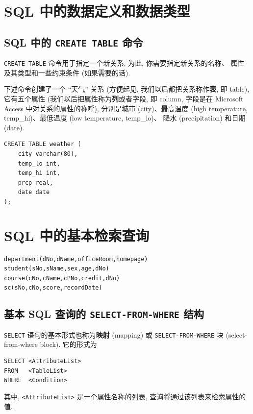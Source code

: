 \documentclass[10pt,UTF8]{book} %
\begin{document}
\section{SQL 中的数据定义和数据类型}

\subsection{SQL 中的 \lstinline|CREATE TABLE| 命令}

\lstinline|CREATE TABLE| 命令用于指定一个新关系, 为此, 你需要指定新关系的名称、
属性及其类型和一些约束条件 (如果需要的话).

\begin{example} 
    下述命令创建了一个 “天气” 关系 (方便起见, 我们以后都把关系称作\textbf{表}, 即 table),
    它有五个属性 (我们以后把属性称为\textbf{列}或者字段, 即 column, 字段是在
    Microsoft Access 中对关系的属性的称呼), 分别是城市 (city)、最高温度 (high temperature, temp\_hi)、最低温度 (low temperature, temp\_lo)、
    降水 (precipitation) 和日期 (date).
\begin{lstlisting}
CREATE TABLE weather (
    city varchar(80),
    temp_lo int,
    temp_hi int,
    prcp real,
    date date
);
\end{lstlisting}
\end{example}

\section{SQL 中的基本检索查询}

\begin{lstlisting}
department(dNo,dName,officeRoom,homepage)
student(sNo,sName,sex,age,dNo)
course(cNo,cName,cPNo,credit,dNo)
sc(sNo,cNo,score,recordDate)
\end{lstlisting}


\subsection{基本 SQL 查询的 \lstinline|SELECT-FROM-WHERE| 结构}

\lstinline|SELECT| 语句的基本形式也称为\textbf{映射} (mapping) 或
\lstinline|SELECT-FROM-WHERE| 块 (select-from-where block). 它的形式为
\begin{lstlisting}
SELECT <AttributeList>
FROM   <TableList>
WHERE  <Condition>
\end{lstlisting}
其中, \lstinline|<AttributeList>| 是一个属性名称的列表, 查询将通过该列表来检索属性的值.
\end{document}
